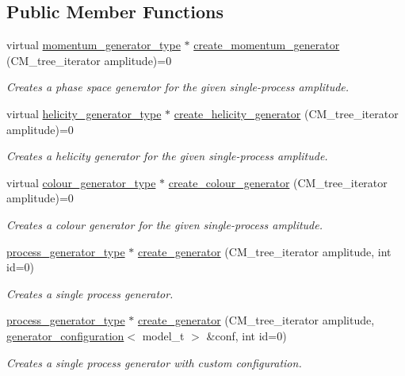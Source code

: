 \subsection*{Public Member Functions}
\begin{DoxyCompactItemize}
\item 
\hypertarget{a00438_a910310c7aabb37f3f93ad6477c3b1021}{}virtual \hyperlink{a00450}{momentum\+\_\+generator\+\_\+type} $\ast$ \hyperlink{a00438_a910310c7aabb37f3f93ad6477c3b1021}{create\+\_\+momentum\+\_\+generator} (C\+M\+\_\+tree\+\_\+iterator amplitude)=0\label{a00438_a910310c7aabb37f3f93ad6477c3b1021}

\begin{DoxyCompactList}\small\item\em Creates a phase space generator for the given single-\/process amplitude. \end{DoxyCompactList}\item 
virtual \hyperlink{a00270}{helicity\+\_\+generator\+\_\+type} $\ast$ \hyperlink{a00438_ac7f8b23c99e1024c16d4a064a862ca4b}{create\+\_\+helicity\+\_\+generator} (C\+M\+\_\+tree\+\_\+iterator amplitude)=0
\begin{DoxyCompactList}\small\item\em Creates a helicity generator for the given single-\/process amplitude. \end{DoxyCompactList}\item 
virtual \hyperlink{a00077}{colour\+\_\+generator\+\_\+type} $\ast$ \hyperlink{a00438_a27f18a9d611a97da7fb6707144e5d501}{create\+\_\+colour\+\_\+generator} (C\+M\+\_\+tree\+\_\+iterator amplitude)=0
\begin{DoxyCompactList}\small\item\em Creates a colour generator for the given single-\/process amplitude. \end{DoxyCompactList}\item 
\hypertarget{a00438_aeabc3ac7b175780c154809cc2c759896}{}\hyperlink{a00436}{process\+\_\+generator\+\_\+type} $\ast$ \hyperlink{a00438_aeabc3ac7b175780c154809cc2c759896}{create\+\_\+generator} (C\+M\+\_\+tree\+\_\+iterator amplitude, int id=0)\label{a00438_aeabc3ac7b175780c154809cc2c759896}

\begin{DoxyCompactList}\small\item\em Creates a single process generator. \end{DoxyCompactList}\item 
\hypertarget{a00438_a3c95670e93bc6fc2e7b114643923fffe}{}\hyperlink{a00436}{process\+\_\+generator\+\_\+type} $\ast$ \hyperlink{a00438_a3c95670e93bc6fc2e7b114643923fffe}{create\+\_\+generator} (C\+M\+\_\+tree\+\_\+iterator amplitude, \hyperlink{a00241}{generator\+\_\+configuration}$<$ model\+\_\+t $>$ \&conf, int id=0)\label{a00438_a3c95670e93bc6fc2e7b114643923fffe}

\begin{DoxyCompactList}\small\item\em Creates a single process generator with custom configuration. \end{DoxyCompactList}\end{DoxyCompactItemize}

